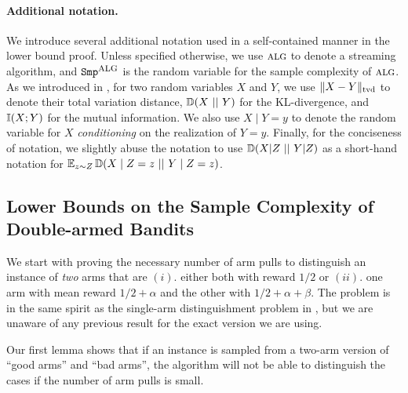 \paragraph{Additional notation.} We introduce several additional notation used in a self-contained manner in the lower bound proof. Unless specified otherwise, we use $\mbox{\sc alg}$
to denote a streaming algorithm, and $\mathtt{Smp^{\mbox{\sc alg}}}$ is the random variable for the sample complexity of $\mbox{\sc alg}$. As we introduced in , for two random variables $X$ and $Y$, we use $\|X - Y\|_{\mathrm{tvd}}$ to denote their total variation distance, $\mathbb{D}(X~||~Y)$ for the KL-divergence, and $\mathbb{I}(X;Y)$ for the mutual information. We also use $X\mid Y=y$ to denote the random variable for $X$ \emph{conditioning} on the realization of $Y=y$. Finally, for the conciseness of notation, we slightly abuse the notation to use $\mathbb{D}(X|Z~||~Y|Z)$ as a short-hand notation for $\operatorname*{{\mathbb{E}}}_{z \sim Z} \mathbb{D}(X \mid Z=z~||~Y \mid Z=z)$.

\subsection{Lower Bounds on the Sample Complexity of Double-armed Bandits}
\label{subsec:two-arm-lb}

We start with proving the necessary number of arm pulls to distinguish an instance of \emph{two} arms that are $(i).$ either both with reward $1/2$ or $(ii).$ one arm with mean reward $1/2+\alpha$ and the other with $1/2+\alpha+\beta$. The problem is in the same spirit as the single-arm distinguishment problem in \cite{AWneurips22,AW23BestArm}, but we are unaware of any previous result for the exact version we are using. %

Our first lemma shows that if an instance is sampled from a two-arm version of ``good arms'' and ``bad arms'', the algorithm will not be able to distinguish the cases if the number of arm pulls is small.


